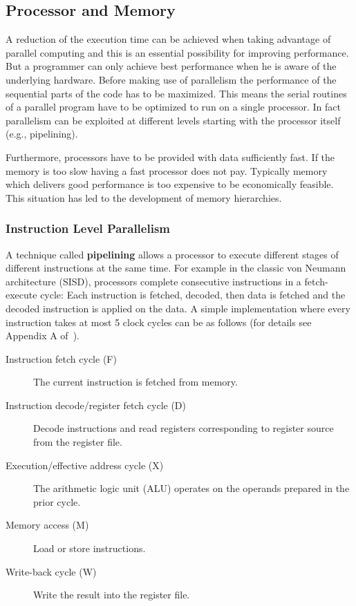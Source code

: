 \subsection{Processor and Memory}
\label{sec:processorandmemory}
A reduction of the execution time can be achieved when taking
advantage of parallel
computing and this is an essential possibility for improving
performance. But a programmer can only achieve best performance when
he is aware of the underlying hardware. Before making use of
parallelism the performance of the sequential parts of the code has to
be maximized. This means the serial routines of a parallel program
have to be optimized to run on a single processor. In fact parallelism can be
exploited at different levels starting with the processor
itself (e.g., pipelining).

Furthermore, processors have to be provided with data
sufficiently fast. If the memory is too slow having a fast processor
does not pay. Typically memory which delivers good performance is too
expensive to be economically feasible. This situation has led to the
development of memory hierarchies.

\subsubsection{Instruction Level Parallelism}
A technique called \textbf{pipelining} allows a processor to execute different
stages of different instructions at the same time.
For example in the classic von Neumann architecture (SISD), processors
complete consecutive instructions in a fetch-execute
cycle: Each instruction is fetched, decoded, then data is fetched and
the decoded instruction is applied on the data.
A simple implementation where every instruction takes at most 5 clock
cycles can be as follows (for details see Appendix A of~\cite{C1quant07}).
\begin{description}
\item[Instruction fetch cycle (F)] The current instruction is fetched from
  memory.
\item[Instruction decode/register fetch cycle (D)] Decode instructions and
  read registers corresponding to register source from the register
  file.
\item[Execution/effective address cycle (X)] The arithmetic logic unit
  (ALU) operates on the operands prepared in the prior cycle.
\item[Memory access (M)] Load or store instructions.
\item[Write-back cycle (W)] Write the result into the register file.
\end{description}

